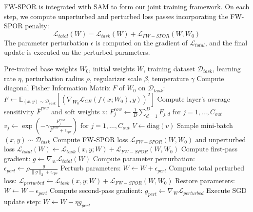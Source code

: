 \documentclass{article}
\theoremstyle{plain}
\theoremstyle{definition}
\theoremstyle{remark}
\begin{document}
FW-SPOR is integrated with SAM to form our joint training framework. On each step, we compute unperturbed and perturbed loss passes incorporating the FW-SPOR penalty:
\begin{equation}
    \mathcal{L}_{total}(W) = \mathcal{L}_{task}(W) + \mathcal{L}_{FW-SPOR}(W, W_0)
\end{equation}
The parameter perturbation $\epsilon$ is computed on the gradient of $\mathcal{L}_{total}$, and the final update is executed on the perturbed parameters.

\begin{algorithm}[tb]
   \caption{Fisher-Weighted SPOR (FW-SPOR) Training Step}
   \label{alg:fw_spor}
\begin{algorithmic}[1]
    Pre-trained base weights $W_0$, initial weights $W$, training dataset $\mathcal{D}_{task}$, learning rate $\eta$, perturbation radius $\rho$, regularizer scale $\beta$, temperature $\gamma$
   \STATE Compute diagonal Fisher Information Matrix $F$ of $W_0$ on $\mathcal{D}_{task}$:
   \STATE $F \leftarrow \mathbb{E}_{(x, y) \sim \mathcal{D}_{task}} \left[ \left( \nabla_{W_0} \mathcal{L}_{CE}(f(x; W_0), y) \right)^2 \right]$
      \STATE Compute layer's average sensitivity $\bar{F}^{row}$ and soft weights $v$:
      \STATE $F^{row}_j \leftarrow \frac{1}{D} \sum_{d=1}^D F_{j,d}$ for $j = 1, \dots, C_{out}$
      \STATE $v_j \leftarrow \exp\left( -\gamma \frac{F^{row}_j}{\bar{F}^{row} + \epsilon_{eps}} \right)$ for $j = 1, \dots, C_{out}$
      \STATE $V \leftarrow \text{diag}(v)$
   \ENDFOR
      \STATE Sample mini-batch $(x, y) \sim \mathcal{D}_{task}$
      \STATE Compute FW-SPOR loss $\mathcal{L}_{FW-SPOR}(W, W_0)$ and unperturbed loss $\mathcal{L}_{total}(W) \leftarrow \mathcal{L}_{task}(x, y; W) + \mathcal{L}_{FW-SPOR}(W, W_0)$
      \STATE Compute first-pass gradient: $g \leftarrow \nabla_W \mathcal{L}_{total}(W)$
      \STATE Compute parameter perturbation: $\epsilon_{pert} \leftarrow \rho \frac{g}{\|g\|_2 + \epsilon_{eps}}$
      \STATE Perturb parameters: $W \leftarrow W + \epsilon_{pert}$
      \STATE Compute total perturbed loss: $\mathcal{L}_{perturbed} \leftarrow \mathcal{L}_{task}(x, y; W) + \mathcal{L}_{FW-SPOR}(W, W_0)$
      \STATE Restore parameters: $W \leftarrow W - \epsilon_{pert}$
      \STATE Compute second-pass gradient: $g_{pert} \leftarrow \nabla_W \mathcal{L}_{perturbed}$
      \STATE Execute SGD update step: $W \leftarrow W - \eta g_{pert}$
   \ENDWHILE
\end{algorithmic}
\end{algorithm}
\end{document}
